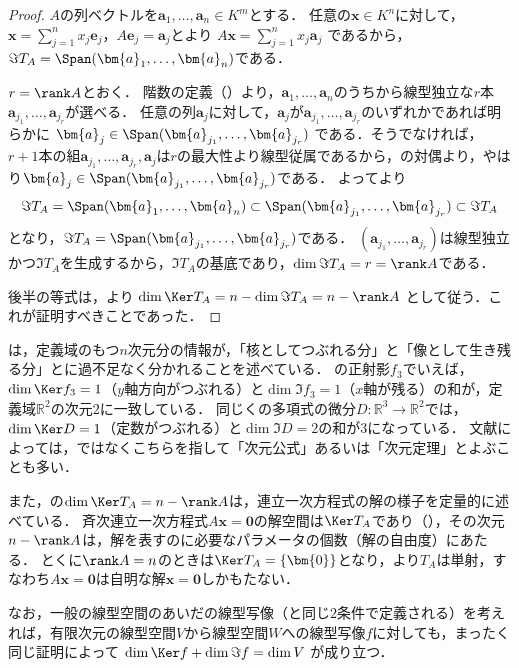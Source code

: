 \begin{tleftbar}
\begin{proof}
  $A$の列ベクトルを$\bm{a}_1, \dots, \bm{a}_n \in K^m$とする．
  任意の$\bm{x} \in K^n$に対して，$\bm{x} = \sum_{j=1}^{n} x_j \bm{e}_j$，$A\bm{e}_j = \bm{a}_j$とより
  $A\bm{x} = \sum_{j=1}^{n} x_j \bm{a}_j$
  であるから，$\Im T_A = \Span(\bm{a}_1, \dots, \bm{a}_n)$である．

  $r = \rank A$とおく．
  階数の定義（）より，$\bm{a}_1, \dots, \bm{a}_n$のうちから線型独立な$r$本$\bm{a}_{j_1}, \dots, \bm{a}_{j_r}$が選べる．
  任意の列$\bm{a}_j$に対して，$\bm{a}_j$が$\bm{a}_{j_1}, \dots, \bm{a}_{j_r}$のいずれかであれば明らかに
  $\bm{a}_j \in \Span(\bm{a}_{j_1}, \dots, \bm{a}_{j_r})$
  である．そうでなければ，$r + 1$本の組$\bm{a}_{j_1}, \dots, \bm{a}_{j_r}, \bm{a}_j$は$r$の最大性より線型従属であるから，の対偶より，やはり$\bm{a}_j \in \Span(\bm{a}_{j_1}, \dots, \bm{a}_{j_r})$である．
  よってより
  \[
    \Im T_A = \Span(\bm{a}_1, \dots, \bm{a}_n)
    \subset \Span(\bm{a}_{j_1}, \dots, \bm{a}_{j_r})
    \subset \Im T_A
  \]
  となり，$\Im T_A = \Span(\bm{a}_{j_1}, \dots, \bm{a}_{j_r})$である．
  $(\bm{a}_{j_1}, \dots, \bm{a}_{j_r})$は線型独立かつ$\Im T_A$を生成するから，$\Im T_A$の基底であり，$\dim \Im T_A = r = \rank A$である．

  後半の等式は，より
  $\dim \Ker T_A = n - \dim \Im T_A = n - \rank A$
  として従う．これが証明すべきことであった．
\end{proof}
\end{tleftbar}

\begin{remark}[次元公式の解釈と解の自由度]
  は，定義域のもつ$n$次元分の情報が，「核としてつぶれる分」と「像として生き残る分」とに過不足なく分かれることを述べている．
  の正射影$f_3$でいえば，$\dim \Ker f_3 = 1$（$y$軸方向がつぶれる）と$\dim \Im f_3 = 1$（$x$軸が残る）の和が，定義域$\mathbb{R}^2$の次元$2$に一致している．
  同じくの多項式の微分$D\colon\mathbb{R}^3\to\mathbb{R}^2$では，$\dim\Ker D=1$（定数がつぶれる）と$\dim\Im D=2$の和が$3$になっている．
  文献によっては，ではなくこちらを指して「次元公式」あるいは「次元定理」とよぶことも多い．

  また，の$\dim \Ker T_A = n - \rank A$は，連立一次方程式の解の様子を定量的に述べている．
  斉次連立一次方程式$A\bm{x} = \bm{0}$の解空間は$\Ker T_A$であり（），その次元$n - \rank A$は，解を表すのに必要なパラメータの個数（解の自由度）にあたる．
  とくに$\rank A = n$のときは$\Ker T_A = \{\bm{0}\}$となり，より$T_A$は単射，すなわち$A\bm{x} = \bm{0}$は自明な解$\bm{x} = \bm{0}$しかもたない．

  なお，一般の線型空間のあいだの線型写像（と同じ$2$条件で定義される）を考えれば，有限次元の線型空間$V$から線型空間$W$への線型写像$f$に対しても，まったく同じ証明によって
  $\dim \Ker f + \dim \Im f = \dim V$
  が成り立つ．
\end{remark}

